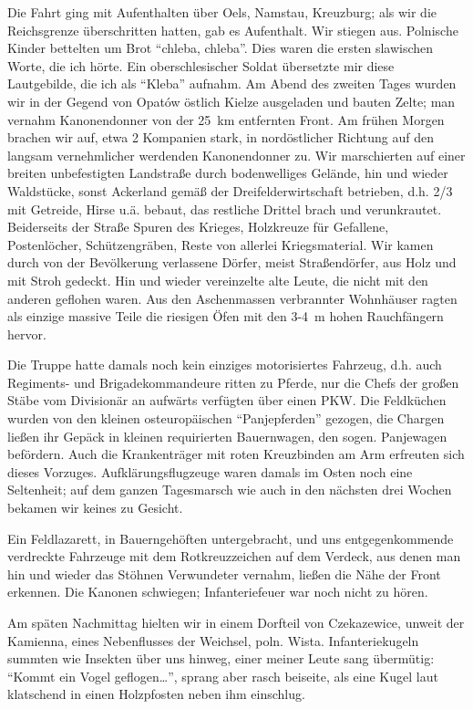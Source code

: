 \documentclass[a5paper,pagesize,10pt,twoside=true]{scrbook}
\renewcommand{\marginpar}[2][]{}
\begin{document}
Die Fahrt ging mit Aufenthalten über Oels, Namstau, Kreuzburg; als wir die Reichsgrenze überschritten hatten, gab es Aufenthalt. Wir stiegen aus. Polnische Kinder bettelten um Brot \enquote{chleba, chleba}. Dies waren die ersten slawischen Worte, die ich hörte. Ein oberschlesischer Soldat übersetzte mir diese Lautgebilde, die ich als \enquote{Kleba} aufnahm. Am Abend des zweiten Tages wurden wir in der Gegend von Opatów östlich Kielze ausgeladen und bauten Zelte; man vernahm Kanonendonner von der 25~km entfernten Front. Am frühen Morgen brachen wir auf, etwa 2 Kompanien stark, in nordöstlicher Richtung auf den langsam vernehmlicher werdenden Kanonendonner zu. Wir marschierten auf einer breiten unbefestigten Landstraße durch bodenwelliges Gelände, hin und wieder Waldstücke, sonst Ackerland gemäß der Dreifelderwirtschaft betrieben, d.h. 2/3 mit Getreide, Hirse u.ä. bebaut, das restliche Drittel brach und verunkrautet. Beiderseits der Straße Spuren des Krieges, Holzkreuze für Gefallene, Postenlöcher, Schützengräben, Reste von allerlei Kriegsmaterial. Wir kamen durch von der Bevölkerung verlassene Dörfer, meist Straßendörfer, aus Holz und mit Stroh gedeckt. Hin und wieder vereinzelte alte Leute, die nicht mit den anderen geflohen waren. Aus den Aschenmassen verbrannter Wohnhäuser ragten als einzige massive Teile die riesigen Öfen mit den 3-4~m hohen Rauchfängern hervor.

\marginpar{185}
Die Truppe hatte damals noch kein einziges motorisiertes Fahrzeug, d.h. auch Regiments- und Brigadekommandeure ritten zu Pferde, nur die Chefs der großen Stäbe vom Divisionär an aufwärts verfügten über einen PKW. Die Feldküchen wurden von den kleinen osteuropäischen \enquote{Panjepferden} gezogen, die Chargen ließen ihr Gepäck in kleinen requirierten Bauernwagen, den sogen. Panjewagen befördern. Auch die Krankenträger mit roten Kreuzbinden am Arm erfreuten sich dieses Vorzuges. Aufklärungsflugzeuge waren damals im Osten noch eine Seltenheit; auf dem ganzen Tagesmarsch wie auch in den nächsten drei Wochen bekamen wir keines zu Gesicht.

Ein Feldlazarett, in Bauerngehöften untergebracht, und uns entgegenkommende verdreckte Fahrzeuge mit dem Rotkreuzzeichen auf dem Verdeck, aus denen man hin und wieder das Stöhnen Verwundeter vernahm, ließen die Nähe der Front erkennen. Die Kanonen schwiegen; Infanteriefeuer war noch nicht zu hören.

Am späten Nachmittag hielten wir in einem Dorfteil von Czekazewice, unweit der Kamienna, eines Nebenflusses der Weichsel, poln. Wista. Infanteriekugeln summten wie Insekten über uns hinweg, einer meiner Leute sang übermütig: \enquote{Kommt ein Vogel geflogen\dots}, sprang aber rasch beiseite, als eine Kugel laut klatschend in einen Holzpfosten neben ihm einschlug.
\end{document}
